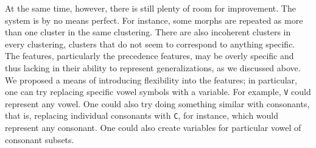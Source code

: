 At the same time, however, there is still plenty of room for improvement. The system is by no means perfect. For instance, some morphs are repeated as more than one cluster in the same clustering. There are also incoherent clusters in every clustering, clusters that do not seem to correspond to anything specific.
The features, particularly the precedence features, may be overly specific and thus lacking in their ability to represent generalizations, as we discussed above. We proposed a means of introducing flexibility into the features; in particular, one can try replacing specific vowel symbols with a variable. For example, \texttt{V} could represent any vowel. One could also try doing something similar with consonants, that is, replacing individual consonants with \texttt{C}, for instance, which would represent any consonant. One could also create variables for particular vowel of consonant subsets. %



%


